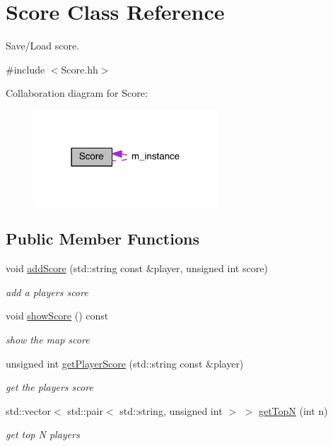 \hypertarget{class_score}{}\section{Score Class Reference}
\label{class_score}


Save/\+Load score.  




{\ttfamily \#include $<$Score.\+hh$>$}



Collaboration diagram for Score\+:\nopagebreak
\begin{figure}[H]
\begin{center}
\leavevmode
\includegraphics[width=195pt]{class_score__coll__graph}
\end{center}
\end{figure}
\subsection*{Public Member Functions}
\begin{DoxyCompactItemize}
\item 
void \hyperlink{class_score_a54ba906f1e5c010712ef2ba7035ea896}{add\+Score} (std\+::string const \&player, unsigned int score)
\begin{DoxyCompactList}\small\item\em add a player\textquotesingle{}s score \end{DoxyCompactList}\item 
void \hyperlink{class_score_a6c79b77f95e119a02dcdcbc89280bf6d}{show\+Score} () const 
\begin{DoxyCompactList}\small\item\em show the map score \end{DoxyCompactList}\item 
unsigned int \hyperlink{class_score_a5cb798e843bd541076b1e28f339273e9}{get\+Player\+Score} (std\+::string const \&player)
\begin{DoxyCompactList}\small\item\em get the player\textquotesingle{}s score \end{DoxyCompactList}\item 
std\+::vector$<$ std\+::pair$<$ std\+::string, unsigned int $>$ $>$ \hyperlink{class_score_a1413934ad0d6ab0cceb364b093f8f038}{get\+Top\+N} (int n)
\begin{DoxyCompactList}\small\item\em get top N players \end{DoxyCompactList}\end{DoxyCompactItemize}
